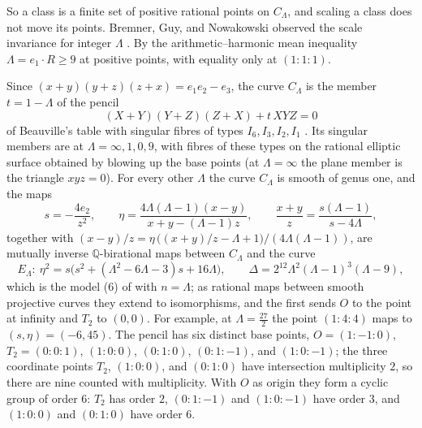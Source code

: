\documentclass[10pt]{article}
\newcommand{\Q}{\mathbb{Q}}
\begin{document}
So a class is a finite set of positive rational points on $C_\Lambda$, and scaling a class does not move its points. Bremner, Guy, and Nowakowski observed the scale invariance for integer $\Lambda$ \cite[p.~117]{bgn1993}. By the arithmetic--harmonic mean inequality $\Lambda=e_1\cdot R\ge9$ at positive points, with equality only at $(1:1:1)$.

\begin{proposition}\label{prop:pencil}
Since $(x+y)(y+z)(z+x)=e_1e_2-e_3$, the curve $C_\Lambda$ is the member $t=1-\Lambda$ of the pencil
\[
  (X+Y)(Y+Z)(Z+X)+t\,XYZ=0
\]
of Beauville's table with singular fibres of types $I_6,I_3,I_2,I_1$ \cite[Th\'eor\`eme and Tableau, p.~658]{beauville1982}. Its singular members are at $\Lambda=\infty,1,0,9$, with fibres of these types on the rational elliptic surface obtained by blowing up the base points (at $\Lambda=\infty$ the plane member is the triangle $xyz=0$). For every other $\Lambda$ the curve $C_\Lambda$ is smooth of genus one, and the maps
\[
  s=-\frac{4e_2}{z^2},\qquad \eta=\frac{4\Lambda(\Lambda-1)(x-y)}{x+y-(\Lambda-1)z},\qquad
  \frac{x+y}{z}=\frac{s(\Lambda-1)}{s-4\Lambda},
\]
together with $(x-y)/z=\eta\,\big((x+y)/z-\Lambda+1\big)/(4\Lambda(\Lambda-1))$, are mutually inverse $\Q$-birational maps between $C_\Lambda$ and the curve
\[
  E_\Lambda:\ \eta^2=s\big(s^2+(\Lambda^2-6\Lambda-3)s+16\Lambda\big),\qquad
  \Delta=2^{12}\Lambda^2(\Lambda-1)^3(\Lambda-9),
\]
which is the model (6) of \cite[p.~118]{bgn1993} with $n=\Lambda$; as rational maps between smooth projective curves they extend to isomorphisms, and the first sends $O$ to the point at infinity and $T_2$ to $(0,0)$. For example, at $\Lambda=\frac{27}2$ the point $(1:4:4)$ maps to $(s,\eta)=(-6,45)$. The pencil has six distinct base points, $O=(1:-1:0)$, $T_2=(0:0:1)$, $(1:0:0)$, $(0:1:0)$, $(0:1:-1)$, and $(1:0:-1)$; the three coordinate points $T_2$, $(1:0:0)$, and $(0:1:0)$ have intersection multiplicity $2$, so there are nine counted with multiplicity. With $O$ as origin they form a cyclic group of order $6$: $T_2$ has order $2$, $(0:1:-1)$ and $(1:0:-1)$ have order $3$, and $(1:0:0)$ and $(0:1:0)$ have order $6$.
\end{proposition}
\end{document}

